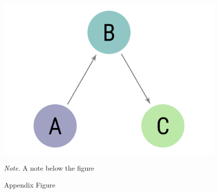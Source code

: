 \documentclass[
  jou,
  floatsintext,
  longtable,
  nolmodern,
  notxfonts,
  notimes,
  colorlinks=true,linkcolor=blue,citecolor=blue,urlcolor=blue]{apa7}
\begin{document}
\begin{figure}

{\caption{{Appendix Figure}{\label{fig-appendfig}}}}

\includegraphics{sampleimage.png}

{\noindent \emph{Note.} A note below the figure}

\end{figure}
\end{document}
